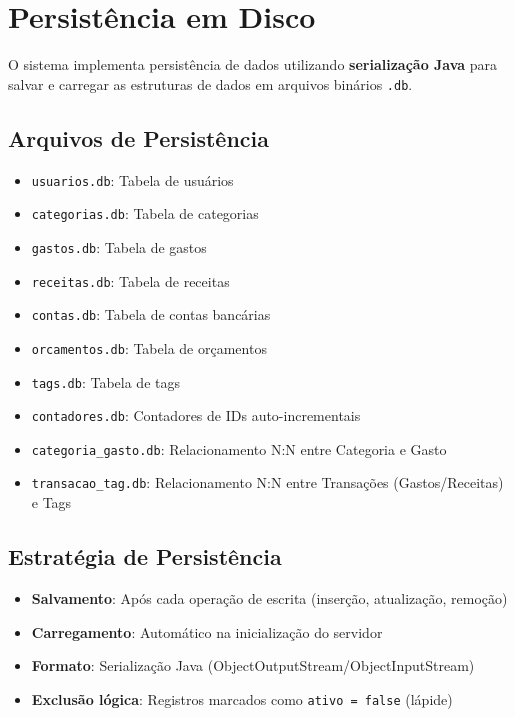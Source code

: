 \documentclass[12pt,a4paper]{article}
\begin{document}
\section{Persistência em Disco}

O sistema implementa persistência de dados utilizando \textbf{serialização Java} para salvar e carregar
as estruturas de dados em arquivos binários \texttt{.db}.

\subsection*{Arquivos de Persistência}
\begin{itemize}
  \item \texttt{usuarios.db}: Tabela de usuários
  \item \texttt{categorias.db}: Tabela de categorias
  \item \texttt{gastos.db}: Tabela de gastos
  \item \texttt{receitas.db}: Tabela de receitas
  \item \texttt{contas.db}: Tabela de contas bancárias
  \item \texttt{orcamentos.db}: Tabela de orçamentos
  \item \texttt{tags.db}: Tabela de tags
  \item \texttt{contadores.db}: Contadores de IDs auto-incrementais
  \item \texttt{categoria\_gasto.db}: Relacionamento N:N entre Categoria e Gasto
  \item \texttt{transacao\_tag.db}: Relacionamento N:N entre Transações (Gastos/Receitas) e Tags
\end{itemize}

\subsection*{Estratégia de Persistência}
\begin{itemize}
  \item \textbf{Salvamento}: Após cada operação de escrita (inserção, atualização, remoção)
  \item \textbf{Carregamento}: Automático na inicialização do servidor
  \item \textbf{Formato}: Serialização Java (ObjectOutputStream/ObjectInputStream)
  \item \textbf{Exclusão lógica}: Registros marcados como \texttt{ativo = false} (lápide)
\end{itemize}
\end{document}
